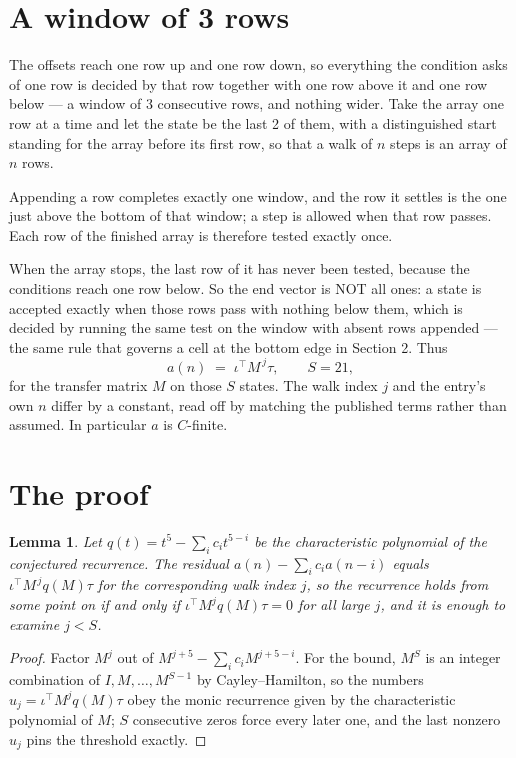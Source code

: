 \documentclass[11pt,a4paper]{article}
\theoremstyle{plain}
\newtheorem{lemma}[theorem]{Lemma}
\theoremstyle{definition}
\begin{document}
\section{A window of 3 rows}

The offsets reach one row up and one row down, so everything the condition asks of one row is
decided by that row together with one row above it and one row below --- a window of
$3$ consecutive rows, and nothing wider. Take the array one row at a time
and let the state be the last 2 of them, with a distinguished start standing for the
array before its first row, so that a walk of $n$ steps is an array of $n$ rows.

Appending a row completes exactly one window, and the row it settles is the one just above the bottom of that window; a step is
allowed when that row passes. Each row of the finished
array is therefore tested exactly once.

When the array stops, the last row of it has never been tested, because the
conditions reach one row below. So the end vector is NOT all ones: a state is accepted exactly when
those rows pass with nothing below them, which is decided by running the same test on the window
with absent rows appended --- the same rule that governs a cell at the bottom edge in
Section 2.
Thus
\[
a(n)\;=\;\iota^{\!\top}M^{\,j}\tau ,\qquad S=21,
\]
for the transfer matrix $M$ on those $S$ states. The walk index $j$ and the entry's own $n$
differ by a constant, read off by matching the published terms rather than assumed. In
particular $a$ is $C$-finite.

\section{The proof}

\begin{lemma}\label{lem:crit}
Let $q(t)=t^{5}-\sum_i c_it^{5-i}$ be the characteristic polynomial of the
conjectured recurrence. The residual $a(n)-\sum_ic_ia(n-i)$ equals
$\iota^{\!\top}M^{\,j}q(M)\tau$ for the corresponding walk index $j$, so the recurrence
holds from some point on if and only if $\iota^{\!\top}M^{j}q(M)\tau=0$ for all large $j$,
and it is enough to examine $j<S$.
\end{lemma}

\begin{proof}
Factor $M^{j}$ out of $M^{j+5}-\sum_ic_iM^{j+5-i}$. For the bound, $M^{S}$
is an integer combination of $I,M,\dots,M^{S-1}$ by Cayley--Hamilton, so the numbers
$u_j=\iota^{\!\top}M^{j}q(M)\tau$ obey the monic recurrence given by the characteristic
polynomial of $M$; $S$ consecutive zeros force every later one, and the last nonzero $u_j$
pins the threshold exactly.
\end{proof}
\end{document}
